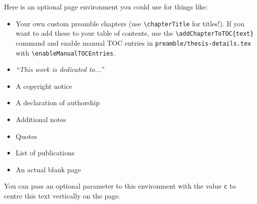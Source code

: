 
\begin{blankpage}
    
    
	Here is an optional page environment you could use for things like:
	\begin{itemize}
		\item Your own custom preamble chapters (use \texttt{\textbackslash chapterTitle} for titles!). If you want to add these to your table of contents, use the \texttt{\textbackslash addChapterToTOC\{text\} } command and enable manual TOC entries in \texttt{preamble/thesis-details.tex} with \texttt{\textbackslash enableManualTOCEntries}.
		\item \emph{``This work is dedicated to...''}
		\item A copyright notice
		\item A declaration of authorship
		\item Additional notes
		\item Quotes
		\item List of publications
		\item An actual blank page
	\end{itemize}
	You can pass an optional parameter to this environment with the value \texttt{c} to centre this text vertically on the page.
\end{blankpage}



